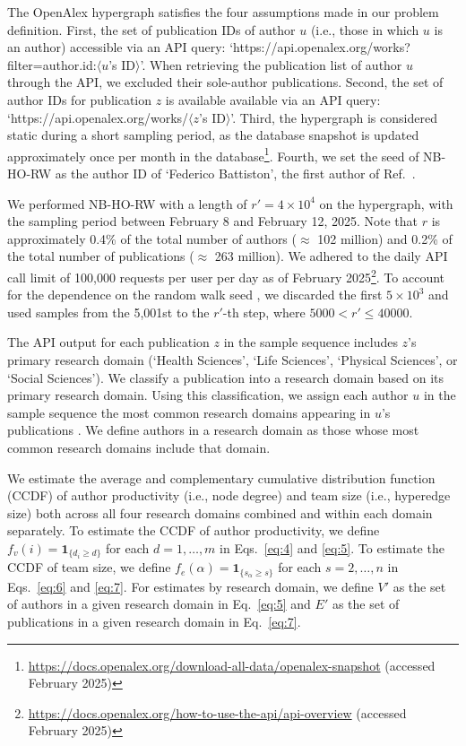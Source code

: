 The OpenAlex hypergraph satisfies the four assumptions made in our problem definition.
First, the set of publication IDs of author $u$ (i.e., those in which $u$ is an author) accessible via an API query: `https://api.openalex.org/works?filter=author.id:$\langle u$'s ID$\rangle$'.
When retrieving the publication list of author $u$ through the API, we excluded their sole-author publications.
Second, the set of author IDs for publication $z$ is available available via an API query: `https://api.openalex.org/works/$\langle z$'s ID$\rangle$'.
Third, the hypergraph is considered static during a short sampling period, as the database snapshot is updated approximately once per month in the database\footnote{\url{https://docs.openalex.org/download-all-data/openalex-snapshot} (accessed February 2025)}.
Fourth, we set the seed of NB-HO-RW as the author ID of `Federico Battiston', the first author of Ref.~\cite{battiston2020}.

We performed NB-HO-RW with a length of $r' = 4 \times 10^4$ on the hypergraph, with the sampling period between February 8 and February 12, 2025.
Note that $r$ is approximately 0.4\% of the total number of authors ($\approx$ 102 million) and 0.2\% of the total number of publications ($\approx$ 263 million).
We adhered to the daily API call limit of 100,000 requests per user per day as of February 2025\footnote{\url{https://docs.openalex.org/how-to-use-the-api/api-overview} (accessed February 2025)}.
To account for the dependence on the random walk seed \cite{gjoka2011}, we discarded the first $5 \times 10^3$ and used samples from the 5,001st to the $r'$-th step, where $5000 < r' \leq 40000$.

The API output for each publication $z$ in the sample sequence includes $z$'s primary research domain (`Health Sciences', `Life Sciences', `Physical Sciences', or `Social Sciences').
We classify a publication into a research domain based on its primary research domain.  
Using this classification, we assign each author $u$ in the sample sequence the most common research domains appearing in $u$'s publications \cite{huang2020, nakajima20232}.  
We define authors in a research domain as those whose most common research domains include that domain.

We estimate the average and complementary cumulative distribution function (CCDF) of author productivity (i.e., node degree) and team size (i.e., hyperedge size) both across all four research domains combined and within each domain separately.
To estimate the CCDF of author productivity, we define $f_{v}(i) = \bm{1}_{\{d_{i} \geq d\}}$ for each $d = 1, \ldots, m$ in Eqs.~\eqref{eq:4} and \eqref{eq:5}.
To estimate the CCDF of team size, we define $f_{e}(\alpha) = \bm{1}_{\{s_{\alpha} \geq s\}}$ for each $s = 2, \ldots, n$ in Eqs.~\eqref{eq:6} and \eqref{eq:7}.
For estimates by research domain, we define $V'$ as the set of authors in a given research domain in Eq.~\eqref{eq:5} and $E'$ as the set of publications in a given research domain in Eq.~\eqref{eq:7}.


